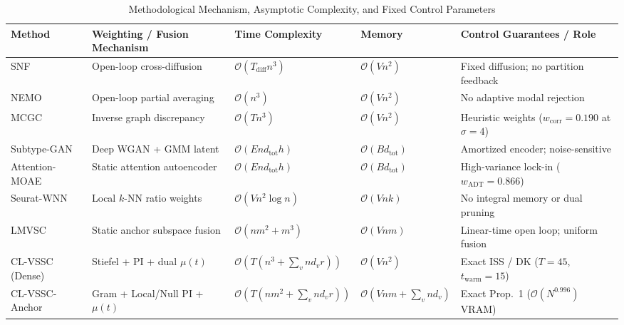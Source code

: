 \begin{table}[t]
\centering
\caption{Methodological Mechanism, Asymptotic Complexity, and Fixed Control Parameters}
\label{tab:p2_stab1}
\scriptsize
\renewcommand{\arraystretch}{1.14}
\setlength{\tabcolsep}{2.4pt}
\begin{tabular}{lllll}
\toprule
Method & Weighting / Fusion Mechanism & Time Complexity & Memory & Control Guarantees / Role \\
\midrule
SNF \cite{wang2014snf} & Open-loop cross-diffusion & $\mathcal{O}(T_{\mathrm{diff}} n^3)$ & $\mathcal{O}(V n^2)$ & Fixed diffusion; no partition feedback \\
NEMO \cite{rappoport2019nemo} & Open-loop partial averaging & $\mathcal{O}(n^3)$ & $\mathcal{O}(V n^2)$ & No adaptive modal rejection \\
MCGC \cite{zhan2019mcgc} & Inverse graph discrepancy & $\mathcal{O}(T n^3)$ & $\mathcal{O}(V n^2)$ & Heuristic weights ($w_{\mathrm{corr}}{=}0.190$ at $\sigma{=}4$) \\
Subtype-GAN \cite{yang2021subtypegan} & Deep WGAN + GMM latent & $\mathcal{O}(E n d_{\mathrm{tot}} h)$ & $\mathcal{O}(B d_{\mathrm{tot}})$ & Amortized encoder; noise-sensitive \\
Attention-MOAE \cite{moon2022moma} & Static attention autoencoder & $\mathcal{O}(E n d_{\mathrm{tot}} h)$ & $\mathcal{O}(B d_{\mathrm{tot}})$ & High-variance lock-in ($w_{\mathrm{ADT}}{=}0.866$) \\
Seurat-WNN \cite{hao2021seuratv4} & Local $k$-NN ratio weights & $\mathcal{O}(V n^2 \log n)$ & $\mathcal{O}(V n k)$ & No integral memory or dual pruning \\
LMVSC \cite{kang2020lmvsc} & Static anchor subspace fusion & $\mathcal{O}(n m^2 + m^3)$ & $\mathcal{O}(V n m)$ & Linear-time open loop; uniform fusion \\
\midrule
CL-VSSC (Dense) & Stiefel + PI + dual $\mu(t)$ & $\mathcal{O}(T(n^3 + \sum_v n d_v r))$ & $\mathcal{O}(V n^2)$ & Exact ISS / DK ($T{=}45$, $t_{\mathrm{warm}}{=}15$) \\
CL-VSSC-Anchor & Gram + Local/Null PI + $\mu(t)$ & $\mathcal{O}(T(nm^2 + \sum_v n d_v r))$ & $\mathcal{O}(Vnm + \sum_v nd_v)$ & Exact Prop.~1 ($\mathcal{O}(N^{0.996})$ VRAM) \\
\bottomrule
\end{tabular}
\end{table}
